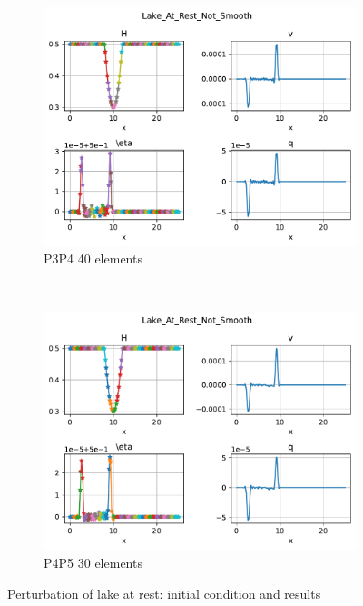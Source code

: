 \documentclass[english]{article}
\theoremstyle{thmstyleone}
\theoremstyle{thmstyletwo}
\theoremstyle{thmstylethree}
\begin{document}
\begin{figure}
\begin{subfigure}{0.60\textwidth}
		\includegraphics[trim= 0 0 0 180, clip,width=\textwidth]{figures/LatRnS_P3P4_N_el00040.pdf}\caption{P3P4 40 elements}
	\end{subfigure}\\
	\begin{subfigure}{0.60\textwidth}
		\includegraphics[trim= 0 0 0 180, clip,width=\textwidth]{figures/LatRnS_P4P5_N_el00030.pdf}\caption{P4P5 30 elements}
	\end{subfigure}
	\caption{Perturbation of lake at rest: initial condition and results}\label{fig:LatR_perturbation}
\end{figure}
\end{document}
